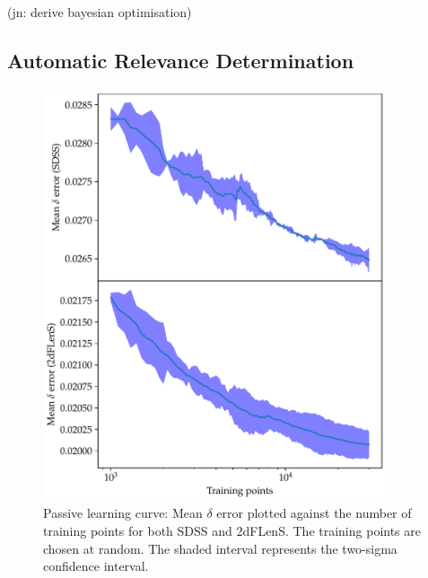 \documentclass[11pt,twoside]{report}
\newcommand\jn[1]{{\color{red}(jn: #1)}}
\begin{document}
\jn{derive bayesian optimisation}

\subsection{Automatic Relevance Determination}
  \begin{figure}
    \centering
    \includegraphics[width=0.9\textwidth]{passive_delta.pdf}
    \caption{Passive learning curve: Mean $\delta$ error plotted against the number of training points for both SDSS and 2dFLenS. The training points are chosen at random. The shaded interval represents the two-sigma confidence interval.}
    \label{fig:passive_delta}
  \end{figure}
\end{document}
